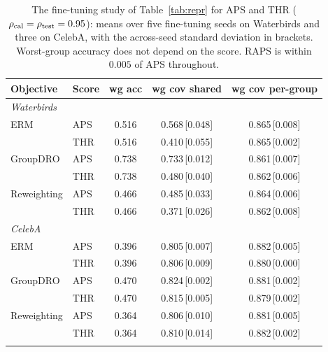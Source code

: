 \begin{table}[!ht]
\centering
\caption{The fine-tuning study of Table~\ref{tab:repr} for APS and THR ($\rho_{\mathrm{cal}}=\rho_{\mathrm{test}}=0.95$): means over five fine-tuning seeds on Waterbirds and three on CelebA, with the across-seed standard deviation in brackets. Worst-group accuracy does not depend on the score. RAPS is within $0.005$ of APS throughout.}
\label{tab:reprfull}
\footnotesize
\setlength{\tabcolsep}{3.5pt}
\begin{tabular}{llccc}
\toprule
Objective & Score & wg acc & wg cov shared & wg cov per-group \\
\midrule
\multicolumn{5}{l}{\emph{Waterbirds}} \\
ERM & APS & 0.516 & 0.568\,[0.048] & 0.865\,[0.008] \\
 & THR & 0.516 & 0.410\,[0.055] & 0.865\,[0.002] \\
GroupDRO & APS & 0.738 & 0.733\,[0.012] & 0.861\,[0.007] \\
 & THR & 0.738 & 0.480\,[0.040] & 0.862\,[0.006] \\
Reweighting & APS & 0.466 & 0.485\,[0.033] & 0.864\,[0.006] \\
 & THR & 0.466 & 0.371\,[0.026] & 0.862\,[0.008] \\
\multicolumn{5}{l}{\emph{CelebA}} \\
ERM & APS & 0.396 & 0.805\,[0.007] & 0.882\,[0.005] \\
 & THR & 0.396 & 0.806\,[0.009] & 0.880\,[0.000] \\
GroupDRO & APS & 0.470 & 0.824\,[0.002] & 0.881\,[0.002] \\
 & THR & 0.470 & 0.815\,[0.005] & 0.879\,[0.002] \\
Reweighting & APS & 0.364 & 0.806\,[0.010] & 0.881\,[0.005] \\
 & THR & 0.364 & 0.810\,[0.014] & 0.882\,[0.002] \\
\botrule
\end{tabular}
\end{table}

